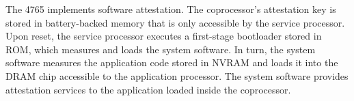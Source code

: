 The 4765 implements software attestation. The coprocessor's attestation key is
stored in battery-backed memory that is only accessible by the service
processor. Upon reset, the service processor executes a first-stage bootloader
stored in ROM, which measures and loads the system software. In turn, the
system software measures the application code stored in NVRAM and loads it into
the DRAM chip accessible to the application processor. The system software
provides attestation services to the application loaded inside the coprocessor.
